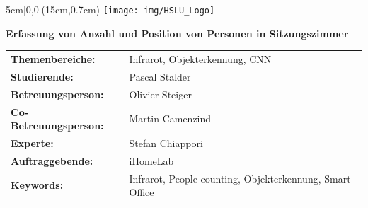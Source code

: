 \documentclass[
	a4paper
]{scrartcl}
\begin{document}

\begin{textblock*}{5cm}[0,0](15cm,0.7cm)
	\texttt{[image: img/HSLU\_Logo]}
\end{textblock*}

\vspace*{2cm}

\noindent
\textbf{\LARGE{Erfassung von Anzahl und Position von Personen in Sitzungszimmer}} \\

\vspace{0.5em}

\bgroup
\setlength\tabcolsep{0cm}

\begin{large}
\noindent
\begin{tabularx}{\textwidth}{p{5cm}X}
	\textbf{Themenbereiche:} & Infrarot, Objekterkennung, CNN\\
	\textbf{Studierende:} & Pascal Stalder\\
	\textbf{Betreuungsperson:} & Olivier Steiger\\
	\textbf{Co-Betreuungsperson:} & Martin Camenzind\\
	\textbf{Experte:} & Stefan Chiappori\\
	\textbf{Auftraggebende:} & iHomeLab\\
	\textbf{Keywords:} & Infrarot, People counting, Objekterkennung, Smart Office\\
\end{tabularx}
\end{large}
\egroup
\end{document}
